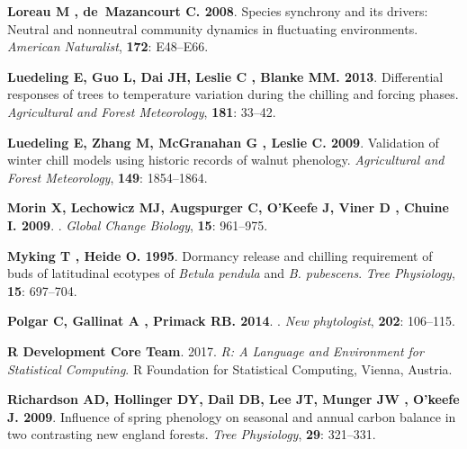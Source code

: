 \documentclass[11pt]{article}
\begin{document}
\begin{thebibliography}{69}
{\bf Loreau M , de~Mazancourt C}{\bf . 2008}.
\newblock Species synchrony and its drivers: Neutral and nonneutral community
  dynamics in fluctuating environments.
\newblock \emph{American Naturalist}, {\bf 172}: E48--E66.

{\bf Luedeling E, Guo L, Dai JH, Leslie C , Blanke MM}{\bf . 2013}.
\newblock Differential responses of trees to temperature variation during the
  chilling and forcing phases.
\newblock \emph{Agricultural and Forest Meteorology}, {\bf 181}: 33--42.

{\bf Luedeling E, Zhang M, McGranahan G , Leslie C}{\bf . 2009}.
\newblock Validation of winter chill models using historic records of walnut
  phenology.
\newblock \emph{Agricultural and Forest Meteorology}, {\bf 149}: 1854--1864.

{\bf Morin X, Lechowicz MJ, Augspurger C, O'Keefe J, Viner D , Chuine I}{\bf .
  2009}.
.
\newblock \emph{Global Change Biology}, {\bf 15}: 961--975.

{\bf Myking T , Heide O}{\bf . 1995}.
\newblock Dormancy release and chilling requirement of buds of latitudinal
  ecotypes of \textit{{Betula pendula}} and \textit{{B. pubescens}}.
\newblock \emph{Tree Physiology}, {\bf 15}: 697--704.

{\bf Polgar C, Gallinat A , Primack RB}{\bf . 2014}.
.
\newblock \emph{New phytologist}, {\bf 202}: 106--115.

{\bf {R Development Core Team}}. 2017.
\newblock \emph{R: A Language and Environment for Statistical Computing}.
\newblock R Foundation for Statistical Computing, Vienna, Austria.

{\bf Richardson AD, Hollinger DY, Dail DB, Lee JT, Munger JW , O'keefe J}{\bf .
  2009}.
\newblock Influence of spring phenology on seasonal and annual carbon balance
  in two contrasting new england forests.
\newblock \emph{Tree Physiology}, {\bf 29}: 321--331.


\end{thebibliography}
\end{document}

